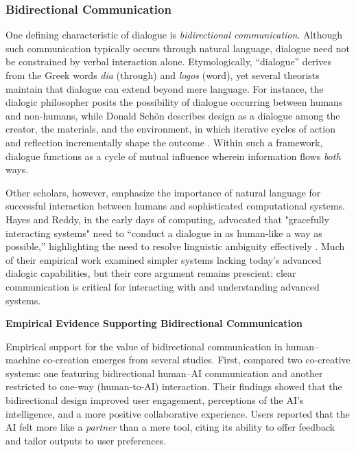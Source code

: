 \subsubsection{Bidirectional Communication}

One defining characteristic of dialogue is \textit{bidirectional communication}. Although such communication typically occurs through natural language, dialogue need not be constrained by verbal interaction alone. Etymologically, “dialogue” derives from the Greek words \textit{dia} (through) and \textit{logos} (word), yet several theorists maintain that dialogue can extend beyond mere language. For instance, the dialogic philosopher \cite{Buber1923-us} posits the possibility of dialogue occurring between humans and non-humans, while Donald Schön describes design as a dialogue among the creator, the materials, and the environment, in which iterative cycles of action and reflection incrementally shape the outcome \cite{Schon1987-fy,Schon1992-jt}. Within such a framework, dialogue functions as a cycle of mutual influence wherein information flows \textit{both} ways.

Other scholars, however, emphasize the importance of natural language for successful interaction between humans and sophisticated computational systems. Hayes and Reddy, in the early days of computing, advocated that "gracefully interacting systems" need to “conduct a dialogue in as human-like a way as possible,” highlighting the need to resolve linguistic ambiguity effectively \cite{Hayes1983-ca}. Much of their empirical work examined simpler systems lacking today’s advanced dialogic capabilities, but their core argument remains prescient: clear communication is critical for interacting with and understanding advanced systems.

\textbf{Empirical Evidence Supporting Bidirectional Communication}

Empirical support for the value of bidirectional communication in human–machine co-creation emerges from several studies. First, \cite{Rezwana2022-gg} compared two co-creative systems: one featuring bidirectional human–AI communication and another restricted to one-way (human-to-AI) interaction. Their findings showed that the bidirectional design improved user engagement, perceptions of the AI’s intelligence, and a more positive collaborative experience. Users reported that the AI felt more like a \textit{partner} than a mere tool, citing its ability to offer feedback and tailor outputs to user preferences. 

